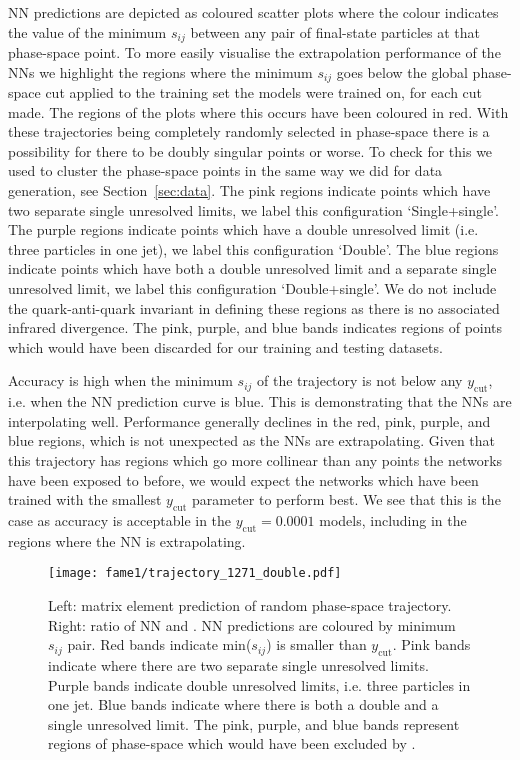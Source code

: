 \documentclass[main.tex]{subfiles}
\begin{document}
NN predictions are depicted as coloured scatter plots where the colour indicates the value of the minimum $s_{ij}$ between any pair of final-state particles at that phase-space point.
To more easily visualise the extrapolation performance of the NNs we highlight the regions where the minimum $s_{ij}$ goes below the global phase-space cut applied to the training set the models were trained on, 
for each cut made. The regions of the plots where this occurs have been coloured in red.  
With these trajectories being completely randomly selected in phase-space there is a possibility for there to be doubly singular points or worse.
To check for this we used {\FastJet} to cluster the phase-space points in the same way we did for data generation, see Section~\ref{sec:data}.
The pink regions indicate points which have two separate single unresolved limits, we label this configuration `Single+single'.
The purple regions indicate points which have a double unresolved limit (i.e. three particles in one jet), we label this configuration `Double'.
The blue regions indicate points which have both a double unresolved limit and a separate single unresolved limit, we label this configuration `Double+single'.
We do not include the quark-anti-quark invariant in defining these regions as there is no associated infrared divergence.
The pink, purple, and blue bands indicates regions of points which would have been discarded for our training and testing datasets.

Accuracy is high when the minimum $s_{ij}$ of the trajectory is not below any $y_{\mathrm{cut}}$, i.e. when the NN prediction curve is blue.
This is demonstrating that the NNs are interpolating well.
Performance generally declines in the red, pink, purple, and blue regions, which is not unexpected as the NNs are extrapolating.
Given that this trajectory has regions which go more collinear than any points the networks have been exposed to before, we would expect the networks which
have been trained with the smallest $y_{\mathrm{cut}}$ parameter to perform best.
We see that this is the case as accuracy is acceptable in the $y_{\mathrm{cut}} = 0.0001$ models, including in the regions where the NN is extrapolating.


\begin{figure}
    \centering
    \texttt{[image: fame1/trajectory\_1271\_double.pdf]}
    \caption{Left: matrix element prediction of random phase-space trajectory.
    Right: ratio of NN and {\NJet}.
    NN predictions are coloured by minimum $s_{ij}$ pair.
    Red bands indicate min($s_{ij}$) is smaller than $y_{\mathrm{cut}}$.
    Pink bands indicate where there are two separate single unresolved limits.
    Purple bands indicate double unresolved limits, i.e. three particles in one jet.
    Blue bands indicate where there is both a double and a single unresolved limit.
    The pink, purple, and blue bands represent regions of phase-space which would have been excluded by {\FastJet}.}
    \label{fig:random_trajectory}
\end{figure}
\end{document}
